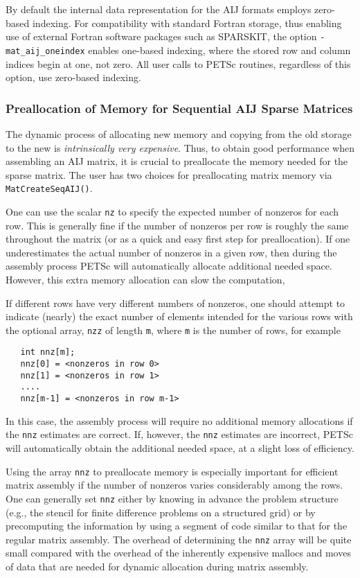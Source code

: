 By default the internal data representation for the AIJ formats employs
zero-based indexing.  For compatibility with standard Fortran storage,
thus enabling use of external Fortran software packages such as
SPARSKIT,  the option {\tt -mat\_aij\_oneindex}
 enables one-based indexing, where the stored
row and column indices begin at one, not zero.  All user calls to
PETSc routines, regardless of this option, use zero-based indexing.

\subsubsection{Preallocation of Memory for Sequential AIJ Sparse Matrices}

The dynamic process of allocating new memory and copying from the old
storage to the new is {\em intrinsically very expensive}.  Thus, to
obtain good performance when assembling an AIJ matrix, it is crucial
to preallocate the memory needed for the sparse matrix.  The user has
two choices for preallocating matrix memory via {\tt
MatCreateSeqAIJ()}. 

One can use the scalar {\tt nz} to specify the expected
number of nonzeros for each row.  This is generally fine if the number
of nonzeros per row is roughly the same throughout the matrix (or as a
quick and easy first step for preallocation).  If one underestimates
the actual number of nonzeros in a given row, then during the assembly
process PETSc will automatically allocate additional needed space.
However, this extra memory allocation can slow the computation,

If different rows have very different numbers of nonzeros, one
should attempt to indicate (nearly) the exact number of elements
intended for the various rows with the optional array, {\tt nzz} of
length {\tt m}, where {\tt m} is the number of rows, for example
\begin{verbatim}
   int nnz[m];
   nnz[0] = <nonzeros in row 0>
   nnz[1] = <nonzeros in row 1>
   ....
   nnz[m-1] = <nonzeros in row m-1>
\end{verbatim}
In this case, the assembly process will require no additional memory
allocations if the {\tt nnz} estimates are correct. If, however,
the {\tt nnz} estimates are incorrect, PETSc will automatically
obtain the additional needed space, at a slight loss of efficiency.

Using the array {\tt nnz} to preallocate memory is especially
important for efficient matrix assembly if the number of nonzeros
varies considerably among the rows.  One can generally set {\tt nnz}
either by knowing in advance the problem structure (e.g., the stencil
for finite difference problems on a structured grid) or by
precomputing the information by using a segment of code similar to
that for the regular matrix assembly.  The overhead of determining the
{\tt nnz} array will be quite small compared with the overhead of the
inherently expensive mallocs and moves of data that are needed for
dynamic allocation during matrix assembly.

